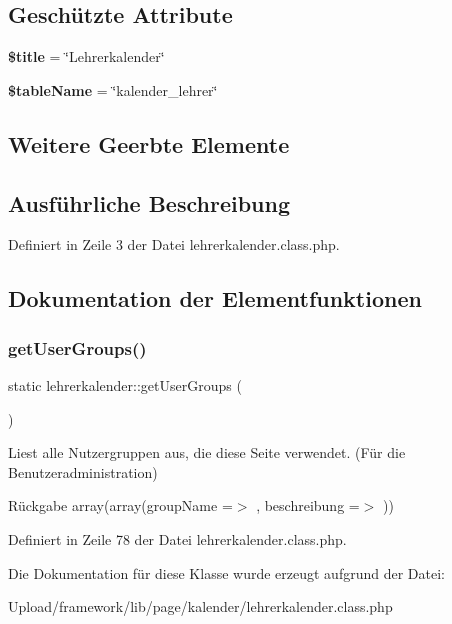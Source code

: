 \subsection*{Geschützte Attribute}
\begin{DoxyCompactItemize}
\item 
\mbox{\label{classlehrerkalender_ac50f673cda105a3d6973b910aee98326}} 
{\bfseries \$title} = \char`\"{}Lehrerkalender\char`\"{}
\item 
\mbox{\label{classlehrerkalender_aa5b300bd2a257811210cf7ac15307351}} 
{\bfseries \$table\+Name} = \char`\"{}kalender\+\_\+lehrer\char`\"{}
\end{DoxyCompactItemize}
\subsection*{Weitere Geerbte Elemente}


\subsection{Ausführliche Beschreibung}


Definiert in Zeile 3 der Datei lehrerkalender.\+class.\+php.



\subsection{Dokumentation der Elementfunktionen}
\mbox{\label{classlehrerkalender_ac26ab312a449a43cec8f42e2a23c6f90}} 
\subsubsection{\texorpdfstring{get\+User\+Groups()}{getUserGroups()}}
{\footnotesize\ttfamily static lehrerkalender\+::get\+User\+Groups (\begin{DoxyParamCaption}{ }\end{DoxyParamCaption})\hspace{0.3cm}{\ttfamily [static]}}

Liest alle Nutzergruppen aus, die diese Seite verwendet. (Für die Benutzeradministration) \begin{DoxyReturn}{Rückgabe}
array(array(\textquotesingle{}group\+Name\textquotesingle{} =$>$ \textquotesingle{}\textquotesingle{}, \textquotesingle{}beschreibung\textquotesingle{} =$>$ \textquotesingle{}\textquotesingle{})) 
\end{DoxyReturn}


Definiert in Zeile 78 der Datei lehrerkalender.\+class.\+php.



Die Dokumentation für diese Klasse wurde erzeugt aufgrund der Datei\+:\begin{DoxyCompactItemize}
\item 
Upload/framework/lib/page/kalender/lehrerkalender.\+class.\+php\end{DoxyCompactItemize}
